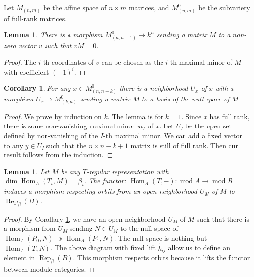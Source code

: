 \documentclass{amsart}
\newtheorem{lemma}[theorem]{Lemma}
\newtheorem{corollary}[theorem]{Corollary}
\theoremstyle{definition}
\theoremstyle{remark}
\numberwithin{equation}{section}
\begin{document}
Let $M_{(n,m)}$ be the affine space of $n\times m$ matrices, and $M_{(n,m)}^0$ be the subvariety of full-rank matrices.

\begin{lemma} There is a morphism $M_{(n,n-1)}^0\to k^n$ sending a matrix $M$ to a non-zero vector $v$ such that $vM=0$.
\end{lemma}

\begin{proof} The $i$-th coordinates of $v$ can be chosen as the $i$-th maximal minor of $M$ with coefficient $(-1)^i$.
\end{proof}

\begin{corollary} \label{C:nullbase} For any $x\in M_{(n,n-k)}^0$ there is a neighborhood $U_x$ of $x$ with a morphism $U_x\to M_{(k,n)}^0$ sending a matrix $M$ to a basis of the null space of $M$.
\end{corollary}

\begin{proof} We prove by induction on $k$. The lemma is for $k=1$. Since $x$ has full rank, there is some non-vanishing maximal minor $m_I$ of $x$. Let $U_I$ be the open set defined by non-vanishing of the $I$-th maximal minor. We can add a fixed vector to any $y\in U_I$ such that the $n\times n-k+1$ matrix is still of full rank. Then our result follows from the induction.
\end{proof}

\begin{lemma} \label{L:open} Let $M$ be any $T$-regular representation with $\dim{\operatorname{Hom}}_A(T_i,M)=\beta_i$.
The functor: ${\operatorname{Hom}}_A(T,-): {\operatorname{mod}} A\to {\operatorname{mod}} B$ induces a morphism respecting orbits from an open neighborhood $U_M$ of $M$ to ${\operatorname{Rep}}_\beta(B)$.
\end{lemma}

\begin{proof} By Corollary \ref{C:nullbase}, we have an open neighborhood $U_M$ of $M$ such that there is a morphism from $U_M$ sending $N\in U_M$ to the null space of ${\operatorname{Hom}}_A(P_0,N)\twoheadrightarrow{\operatorname{Hom}}_A(P_1,N)$. The null space is nothing but ${\operatorname{Hom}}_A(T,N)$. The above diagram with fixed lift $\tilde{h}_{ij}$ allow us to define an element in ${\operatorname{Rep}}_\beta(B)$. This morphism respects orbits because it lifts the functor between module categories.
\end{proof}
\end{document}
